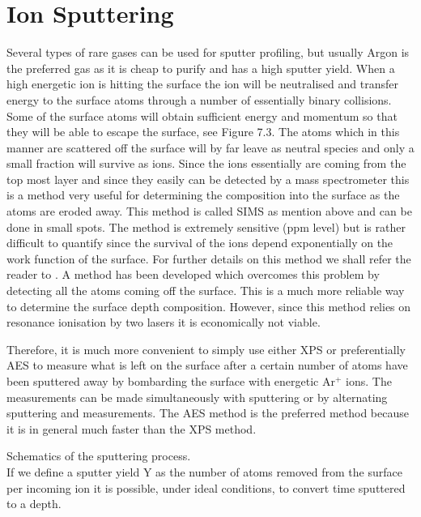 \section{Ion Sputtering}


 Several types of rare gases can be used for sputter
 profiling, but usually Argon is the preferred gas as it is
 cheap to purify and has a high sputter yield. When a
 high energetic ion is hitting the surface the ion will be
 neutralised and transfer energy to the surface atoms
 through a number of essentially binary collisions. Some of
 the surface atoms will obtain sufficient energy and momentum
 so that they will be able to escape the surface, see Figure
 7.3. The atoms which in this manner are scattered off the
 surface will by far leave as neutral species and only a
 small fraction will survive as ions. Since the ions essentially
 are coming from the top most layer and since they easily can be
 detected by a mass spectrometer this is a method very
 useful for determining the composition into the surface as
 the atoms are eroded away. This method is called SIMS as
 mention above and can be done in small spots. The method is
 extremely sensitive (ppm level) but is rather difficult to
 quantify since the survival of the ions depend exponentially on
 the work function of the surface. For further details on
 this method we shall refer the reader to \cite{briggs2}. A
 method has been developed which overcomes this problem by
 detecting all the atoms coming off the surface.
 This is a much more reliable way to determine the surface
 depth composition. However, since this method relies on
 resonance ionisation by two lasers it is economically not
 viable.

 Therefore, it is much more convenient to simply use
 either XPS or preferentially AES to measure what is left on
 the surface after a certain number of atoms have been
 sputtered away by bombarding the surface with energetic
 Ar$^{+}$ ions. The measurements can be made simultaneously
 with sputtering or by alternating sputtering and
 measurements. The AES method is the preferred method because
 it is in general much faster than the XPS method. 

 \vspace*{7cm}

  Schematics of the sputtering
 process.\\




 If we define a sputter yield Y as the number of atoms
 removed from the surface per incoming ion it is possible,
 under ideal conditions, to convert time sputtered to a
 depth.

